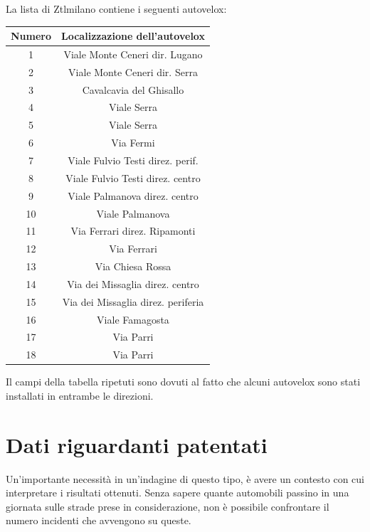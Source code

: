 \documentclass[a4paper,12pt]{report}
\begin{document}
La lista di Ztlmilano contiene i seguenti autovelox: 

\begin{center}
    \def\arraystretch{1.5}%
    \begin{tabular}{ |c|c| } 
    \hline
    Numero & Localizzazione dell'autovelox \\ 
    \hline
    \rowcolor{TableGray}
    1   &   Viale Monte Ceneri  dir. Lugano\\
    2   &   Viale Monte Ceneri dir. Serra\\
    \rowcolor{TableGray}
    3   &   Cavalcavia del Ghisallo\\
    4   &   Viale Serra \\
    \rowcolor{TableGray}
    5   &   Viale Serra\\
    6   &   Via Fermi\\
    \rowcolor{TableGray}
    7   &   Viale Fulvio Testi direz. perif.\\
    8   &   Viale Fulvio Testi direz. centro\\
    \rowcolor{TableGray}
    9   &   Viale Palmanova  direz. centro\\
    10  &   Viale Palmanova\\
    \rowcolor{TableGray}
    11  &   Via Ferrari direz. Ripamonti\\
    12  &   Via Ferrari\\
    \rowcolor{TableGray}
    13  &   Via Chiesa Rossa\\
    14  &   Via dei Missaglia direz. centro\\
    \rowcolor{TableGray}
    15  &   Via dei Missaglia direz. periferia\\
    16  &   Viale Famagosta\\
    \rowcolor{TableGray}
    17  &   Via Parri\\
    18  &   Via Parri\\
    \hline
    \end{tabular}
    \label{ztl-milano}
\end{center}

Il campi della tabella ripetuti sono dovuti al fatto che alcuni autovelox sono stati 
installati in entrambe le direzioni.

\section{Dati riguardanti patentati}

Un'importante necessità in un'indagine di questo tipo, è avere un contesto con cui 
interpretare i risultati ottenuti. 
Senza sapere quante automobili passino in una giornata sulle strade prese in considerazione, 
non è possibile confrontare il numero incidenti che avvengono su queste.
\end{document}
